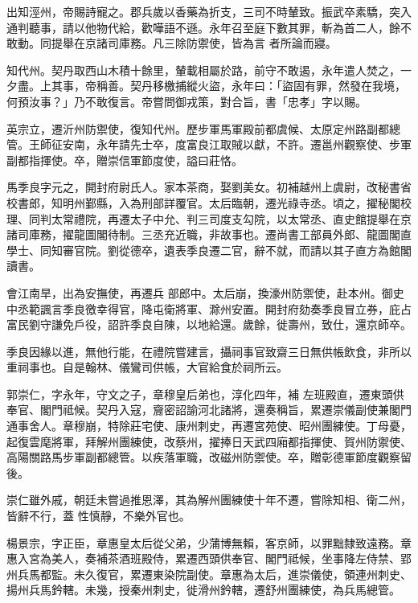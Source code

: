 \begin{pinyinscope}
 出知涇州，帝賜詩寵之。郡兵歲以香藥為折支，三司不時輦致。振武卒素驕，突入通判聽事，請以他物代給，歡嘩語不遜。永年召至庭下數其罪，斬為首二人，餘不敢動。同提舉在京諸司庫務。凡三除防禦使，皆為言
 者所論而寢。



 知代州。契丹取西山木積十餘里，輦載相屬於路，前守不敢遏，永年遣人焚之，一夕盡。上其事，帝稱善。契丹移檄捕縱火盜，永年曰：「盜固有罪，然發在我境，何預汝事？」乃不敢復言。帝嘗問御戎策，對合旨，書「忠孝」字以賜。



 英宗立，遷沂州防禦使，復知代州。歷步軍馬軍殿前都虞候、太原定州路副都總管。王師征安南，永年請先士卒，度富良江取賊以獻，不許。遷邕州觀察使、步軍副都指揮使。卒，贈崇信軍節度使，謚曰莊恪。



 馬季良字元之，開封府尉氏人。家本茶商，娶劉美女。初補越州上虞尉，改秘書省校書郎，知明州鄞縣，入為刑部詳覆官。太后臨朝，遷光祿寺丞。頃之，擢秘閣校理、同判太常禮院，再遷太子中允、判三司度支勾院，以太常丞、直史館提舉在京諸司庫務，擢龍圖閣待制。三丞充近職，非故事也。遷尚書工部員外郎、龍圖閣直學士、同知審官院。劉從德卒，遺表季良遷二官，辭不就，而請以其子直方為館閣讀書。



 會江南旱，出為安撫使，再遷兵
 部郎中。太后崩，換濠州防禦使，赴本州。御史中丞範諷言季良徼幸得官，降屯衛將軍、滁州安置。開封府劾奏季良冒立券，庇占富民劉守謙免戶役，詔許季良自陳，以地給還。歲餘，徙壽州，致仕，還京師卒。



 季良因緣以進，無他行能，在禮院嘗建言，攝祠事官致齋三日無供帳飲食，非所以重祠事也。自是翰林、儀鸞司供帳，大官給食於祠所云。



 郭崇仁，字永年，守文之子，章穆皇后弟也，淳化四年，補
 左班殿直，遷東頭供奉官、閣門祗候。契丹入寇，齎密詔諭河北諸將，還奏稱旨，累遷崇儀副使兼閣門通事舍人。章穆崩，特除莊宅使、康州刺史，再遷宮苑使、昭州團練使。丁母憂，起復雲麾將軍，拜解州團練使，改蔡州，擢捧日天武四廂都指揮使、賀州防禦使、高陽關路馬步軍副都總管。以疾落軍職，改磁州防禦使。卒，贈彰德軍節度觀察留後。



 崇仁雖外戚，朝廷未嘗過推恩澤，其為解州團練使十年不遷，嘗除知相、衛二州，皆辭不行，蓋
 性慎靜，不樂外官也。



 楊景宗，字正臣，章惠皇太后從父弟，少蒲博無賴，客京師，以罪黜隸致遠務。章惠入宮為美人，奏補茶酒班殿侍，累遷西頭供奉官、閣門祗候，坐事降左侍禁、郢州兵馬都監。未久復官，累遷東染院副使。章惠為太后，進崇儀使，領連州刺史、揚州兵馬鈐轄。未幾，授秦州刺史，徙滑州鈐轄，遷舒州團練使，為兵馬總管。




\end{pinyinscope}

